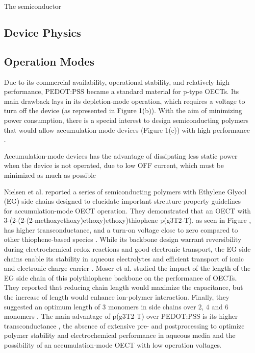 The semiconductor


\subsection{Device Physics}

\subsection{Operation Modes}

Due to its commercial availability, operational stability, and relatively high performance, PEDOT:PSS became a standard material for p-type OECTs. Its main drawback lays in its depletion-mode operation, which requires a voltage to turn off the device (as represented in Figure 1(b)). With the aim of minimizing power consumption, there is a special interest to design semiconducting polymers that would allow accumulation-mode devices (Figure 1(c)) with high performance \cite{nielsenMolecularDesignSemiconducting2016} \cite{tanOrganicMixedIonic2022}.

Accumulation-mode devices has the advantage of dissipating less static power when the device is not operated, due to low OFF current, which must be minimized as much as possible \cite{giovannittiEnergeticControlRedoxActive2020}

Nielsen et al. reported a series of semiconducting polymers with Ethylene Glycol (EG) side chains designed to elucidate important strcuture-property guidelines for accumulation-mode OECT operation. They demonstrated that an OECT with 3-(2-(2-(2-methoxyethoxy)ethoxy)ethoxy)thiophene p(g3T2-T), as seen in Figure , has higher transconductance, and a turn-on voltage close to zero compared to other thiophene-based species \cite{nielsenMolecularDesignSemiconducting2016}. While its backbone design warrant reversibility during electrochemical redox reactions and good electronic transport, the EG side chains enable its stability in aqueous electrolytes and efficient transport of ionic and electronic charge carrier \cite{moiaDesignEvaluationConjugated2019}. Moser et al. studied the impact of the length of the EG side chain of this polythiophene backbone on the performance of OECTs. They reported that reducing chain length would maximize the capacitance, but the increase of length would enhance ion-polymer interaction. Finally, they suggested an optimum length of 3 monomers in side chains over 2, 4 and 6 monomers \cite{moserEthyleneGlycolBasedSide2020}. The main advantage of p(g3T2-T) over PEDOT:PSS is its higher transconductance \cite{nielsenMolecularDesignSemiconducting2016}, the absence of extensive pre- and postprocessing to optimize polymer stability and electrochemical performance in aqueous media and the possibility of an accumulation-mode OECT with low operation voltages\cite{moserEthyleneGlycolBasedSide2020}.

